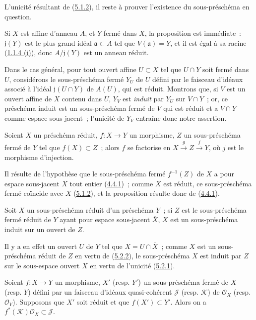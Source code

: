L'unicité résultant de (\hyperref[I.5.1.2-fr]{5.1.2}), il reste à prouver
l'existence du sous-préschéma en question.

Si $X$ est affine d'anneau $A$, et $Y$ fermé dans $X$, la proposition est
immédiate~: $\mathfrak{j}(Y)$ est le plus grand idéal
$\mathfrak{a}\subset A$ tel que $V(\mathfrak{a})=Y$, et il est égal à sa
racine (\hyperref[I.1.1.4-fr]{1.1.4 (i)}), donc
$A/\mathfrak{j}(Y)$ est un anneau réduit.

Dans le cas général, pour tout ouvert affine $U\subset X$ tel que $U\cap Y$
soit fermé dans $U$, considérons le sous-préschéma fermé $Y_U$ de $U$ défini
par le faisceau d'idéaux associé à l'idéal $\mathfrak{j}(U\cap Y)$ de $A(U)$,
qui est réduit. Montrons que, si $V$ est un ouvert affine de $X$ contenu dans
$U$, $Y_V$ est \emph{induit} par $Y_U$ sur $V\cap Y$~; or, ce préschéma
induit est un sous-préschéma fermé de $V$ qui est réduit et a $V\cap Y$ comme
espace sous-jacent~; l'unicité de $Y_V$ entraîne donc notre assertion.

\begin{proposition}[5.2.2]
\label{I.5.2.2-fr}
Soient $X$ un préschéma réduit, $f:X\to Y$ un morphisme, $Z$ un
sous-préschéma fermé de $Y$ tel que $f(X)\subset Z$~; alors $f$ se factorise
en $X\xrightarrow{g}Z\xrightarrow{j}Y$, où $j$ est le morphisme d'injection.
\end{proposition}

Il résulte de l'hypothèse que le sous-préschéma fermé $f^{-1}(Z)$ de $X$ a
pour espace sous-jacent $X$ tout entier
(\hyperref[I.4.4.1-fr]{4.4.1})~; comme $X$ est réduit, ce sous-préschéma fermé
coïncide avec $X$ (\hyperref[I.5.1.2-fr]{5.1.2}), et la proposition résulte
donc de (\hyperref[I.4.4.1-fr]{4.4.1}).

\begin{corollary}[5.2.3]
\label{I.5.2.3-fr}
Soit $X$ un sous-préschéma réduit d'un préschéma $Y$~; si $Z$ est le
sous-préschéma fermé réduit de $Y$ ayant pour espace sous-jacent
$\overline{X}$, $X$ est un sous-préschéma induit sur un ouvert de $Z$.
\end{corollary}

Il y a en effet un ouvert $U$ de $Y$ tel que
$X=U\cap\overline{X}$~; comme $X$ est un sous-préschéma réduit de $Z$ en
vertu de (\hyperref[I.5.2.2-fr]{5.2.2}), le sous-préschéma $X$ est induit par
$Z$ sur le sous-espace ouvert $X$ en vertu de l'unicité
(\hyperref[I.5.2.1-fr]{5.2.1}).

\begin{corollary}[5.2.4]
\label{I.5.2.4-fr}
Soient $f:X\to Y$ un morphisme, $X'$ (\textup{resp.} $Y'$) un sous-préschéma fermé de
$X$ (\textup{resp.} $Y$) défini par un faisceau d'idéaux quasi-cohérent $\mathscr{J}$
(\textup{resp.} $\mathscr{K}$) de $\mathscr{O}_X$ (\textup{resp.} $\mathscr{O}_Y$). Supposons
que $X'$ soit réduit et que $f(X')\subset Y'$. Alors on a
$f^*(\mathscr{K})\mathscr{O}_X\subset\mathscr{J}$.
\end{corollary}


